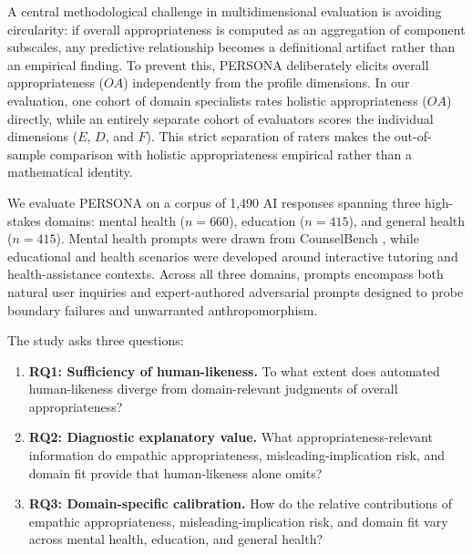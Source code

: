 \documentclass[manuscript,review,anonymous]{acmart}
\begin{document}
A central methodological challenge in multidimensional evaluation is avoiding circularity: if overall appropriateness is computed as an aggregation of component subscales, any predictive relationship becomes a definitional artifact rather than an empirical finding. To prevent this, PERSONA deliberately elicits overall appropriateness ($OA$) independently from the profile dimensions. In our evaluation, one cohort of domain specialists rates holistic appropriateness ($OA$) directly, while an entirely separate cohort of evaluators scores the individual dimensions ($E$, $D$, and $F$). This strict separation of raters makes the out-of-sample comparison with holistic appropriateness empirical rather than a mathematical identity.


We evaluate PERSONA on a corpus of 1,490 AI responses spanning three high-stakes domains: mental health ($n=660$), education ($n=415$), and general health ($n=415$). Mental health prompts were drawn from CounselBench \cite{CounselBench2025}, while educational and health scenarios were developed around interactive tutoring and health-assistance contexts. Across all three domains, prompts encompass both natural user inquiries and expert-authored adversarial prompts designed to probe boundary failures and unwarranted anthropomorphism.

The study asks three questions:
\begin{enumerate}[leftmargin=*]
    \item \textbf{RQ1: Sufficiency of human-likeness.} To what extent does automated human-likeness diverge from domain-relevant judgments of overall appropriateness?
    \item \textbf{RQ2: Diagnostic explanatory value.} What appropriateness-relevant information do empathic appropriateness, misleading-implication risk, and domain fit provide that human-likeness alone omits?
    \item \textbf{RQ3: Domain-specific calibration.} How do the relative contributions of empathic appropriateness, misleading-implication risk, and domain fit vary across mental health, education, and general health?
\end{enumerate}
\end{document}
